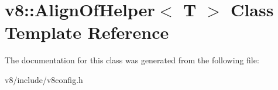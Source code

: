 \hypertarget{classv8_1_1AlignOfHelper}{}\section{v8\+:\+:Align\+Of\+Helper$<$ T $>$ Class Template Reference}
\label{classv8_1_1AlignOfHelper}


The documentation for this class was generated from the following file\+:\begin{DoxyCompactItemize}
\item 
v8/include/v8config.\+h\end{DoxyCompactItemize}
